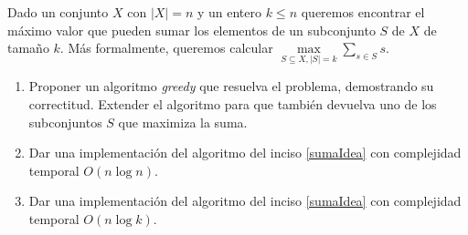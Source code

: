 

\item Dado un conjunto $X$ con $|X| = n$ y un entero $k\leq n$ queremos encontrar el máximo valor que pueden sumar los elementos de un subconjunto $S$ de $X$ de tamaño $k$. Más formalmente, queremos calcular $\max\limits_{S \subseteq X, |S| = k} \sum_{s \in S} s$.

\begin{enumerate}[label=$\alph*)$,ref=$\alph*)$]
    \item Proponer un algoritmo \textit{greedy} que resuelva el problema, demostrando su correctitud. Extender el algoritmo para que también devuelva uno de los subconjuntos $S$ que maximiza la suma.\label{sumaIdea}
    \item Dar una implementación del algoritmo del inciso \ref{sumaIdea} con complejidad temporal $O(n\log n)$.

    \item Dar una implementación del algoritmo del inciso \ref{sumaIdea} con complejidad temporal $O(n \log k)$.
\end{enumerate}


